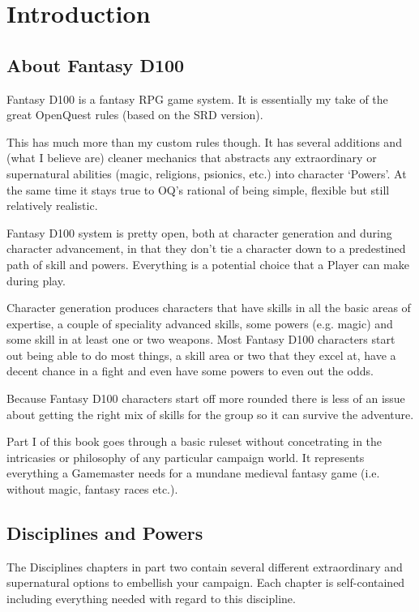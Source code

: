 \chapter{Introduction}
\label{ch:introduction}


\section{About Fantasy D100}

Fantasy D100 is a fantasy RPG game system. It is essentially my take of the great OpenQuest rules (based on the SRD version).

This has much more than my custom rules though. It has several additions and (what I believe are) cleaner mechanics that abstracts any extraordinary or supernatural abilities (magic, religions, psionics, etc.) into character `Powers'. At the same time it stays true to OQ's rational of being simple, flexible but still relatively realistic.

Fantasy D100 system is pretty open, both at character generation and during character advancement, in that they don’t tie a character down to a predestined path of skill and powers. Everything is a potential choice that a Player can make during play.

Character generation produces characters that have skills in all the basic areas of expertise, a couple of speciality advanced skills, some powers (e.g. magic) and some skill in at least one or two weapons. Most Fantasy D100 characters start out being able to do most things, a skill area or two that they excel at, have a decent chance in a fight and even have some powers to even out the odds.

Because Fantasy D100 characters start off more rounded there is less of an issue about getting the right mix of skills for the group so it can survive the adventure.

Part I of this book goes through a basic ruleset without concetrating in the intricasies or philosophy of any particular campaign world. It represents everything a Gamemaster needs for a mundane medieval fantasy game (i.e. without magic, fantasy races etc.). 


\section{Disciplines and Powers}
The Disciplines chapters in part two contain several different extraordinary and supernatural options to embellish your campaign. Each chapter is self-contained including everything needed with regard to this discipline. 

